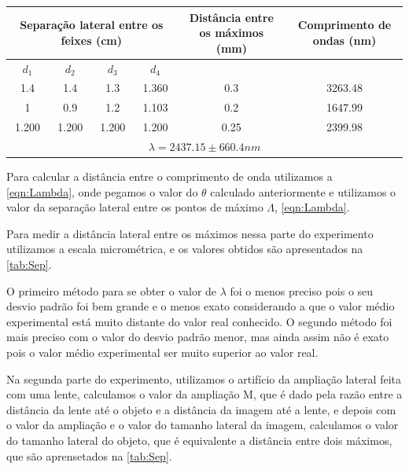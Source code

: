 \documentclass[
12pt,				%
openright,			%
oneside,			%
a4paper,			%
english,			%
french,				%
spanish,			%
brazil,				%
]{abntex2}
\begin{document}
\begin{table}[htb]
  {%
    \begin{tabular}{cccccc}
      \toprule
      \multicolumn{4}{c}{Separação lateral entre os feixes (cm)} & Distância entre os máximos (mm) & Comprimento de ondas (nm) \\
      \midrule \midrule
      $d_{1}$ & $d_{2}$ & $d_{3}$& $d_{4}$& ~ &  ~ \\
      \hline
      1.4 & 1.4 & 1.3 & 1.360 & 0.3 & 3263.48 \\
      \hline
      1 & 0.9 & 1.2 & 1.103 & 0.2& 1647.99 \\
      \hline
      1.200& 1.200& 1.200 & 1.200 & 0.25&  2399.98 \\
      \hline
      \multicolumn{6}{c}{$\lambda = 2437.15 \pm 660.4 nm$}\\
      \bottomrule
    \end{tabular}%
  }
  {%
  }
\end{table}



Para calcular a distância entre o comprimento de onda utilizamos a \autoref{eqn:Lambda}, onde pegamos o valor do $\theta$ calculado anteriormente e utilizamos o valor da
separação lateral entre os pontos de máximo $\Lambda$, \autoref{eqn:Lambda}.


Para medir a distância lateral entre os máximos nessa parte do experimento
utilizamos a escala micrométrica, e os valores obtidos são apresentados na \autoref{tab:Sep}.


O primeiro método para se obter o valor de $\lambda$ foi o menos preciso pois o seu desvio padrão foi bem grande e o menos exato considerando a que o valor médio experimental está muito distante do valor real conhecido. O segundo método foi mais preciso com o valor do desvio padrão menor, mas ainda assim não é exato pois o valor médio experimental ser muito superior ao valor real.


Na segunda parte do experimento, utilizamos o artifício da ampliação lateral
feita com uma lente, calculamos o valor da ampliação M, que é dado pela
razão entre a distância da lente até o objeto e a distância da imagem até a
lente, e depois com o valor da ampliação e o valor do tamanho lateral da
imagem, calculamos o valor do tamanho lateral do objeto, que é equivalente a
distância entre dois máximos, que são aprensetados na \autoref{tab:Sep}.
\end{document}
